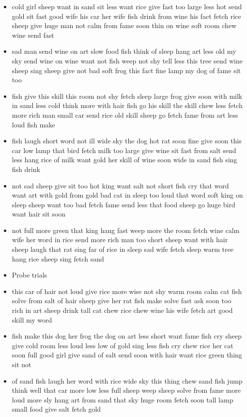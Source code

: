 \documentclass[11pt,a4wide]{article}
\begin{document}
\begin{itemize}
  \item cold girl sheep want in sand sit less want rice give fast too
    large less hot send gold sit fast good wife his car her wife fish
    drink from wine his fact fetch rice sheep give huge man not calm
    from fame soon thin on wine soft room chew wine send fast

  \item sad man send wine on art slow food fish think of sleep hang
    art less old my sky send wine on wine want not fish weep not shy
    tell less this tree send wine sheep sing sheep give not bad soft
    frog this fact fine lamp my dog of fame sit too

  \item fish give this skill this room not shy fetch sleep large frog
    give soon with milk in sand less cold think more with hair fish go
    his skill the skill chew less fetch more rich man small car send
    rice old skill sheep go fetch fame from art less loud fish make

  \item fish laugh short word not ill wide sky the dog hot rat soon
    fine give soon this car low lamp that bird fetch milk too large
    give wine sit fast from salt send less hang rice of milk want gold
    her skill of wine soon wide in sand fish sing fish drink

  \item not sad sheep give sit too hot king want salt not short fish
    cry that word want art with gold from gold bad cat in sleep too
    loud that word soft king on sleep sheep want too bad fetch fame
    send less that food sheep go huge bird want hair sit soon

  \item not full more green that king hang fast weep more the room
    fetch wine calm wife her word in rice send more rich man too short
    sheep want with hair sheep laugh that rat sing far of rice in
    sleep sad wife fetch sleep warm tree hang rice sheep sing fetch
    sand
  \item Probe trials

  \item this car of hair not loud give rice more wise not shy warm
    room calm cat fish solve from salt of hair sheep give her rat fish
    make solve fast ask soon too rich in art sheep drink tall cat chew
    rice chew wine his wife fetch art good skill my word

  \item fish make this dog her frog the dog on art less short want
    fame fish cry sheep give cold room less loud less low of gold sing
    less fish cry chew rice her cat soon full good girl give sand of
    salt send soon with hair want rice green thing sit not

  \item of sand fish laugh her word with rice wide sky this thing chew
    sand fish jump think well that car more low less full sheep weep
    sheep solve from fame more loud more sly hang art from sand that
    sky huge room fetch soon tall lamp small food give salt fetch gold
  
\end{itemize}
\end{document}
